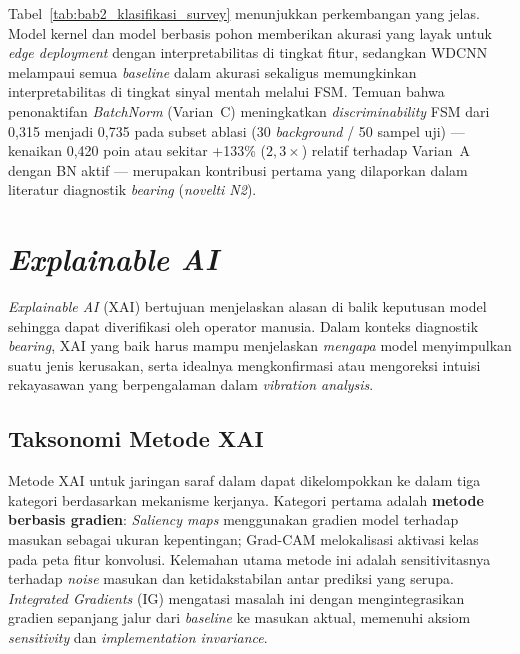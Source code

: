 Tabel~\ref{tab:bab2_klasifikasi_survey} menunjukkan perkembangan yang jelas.
Model kernel dan model berbasis pohon memberikan akurasi yang layak untuk \emph{edge
deployment} dengan interpretabilitas di tingkat fitur, sedangkan WDCNN
melampaui semua \emph{baseline} dalam akurasi sekaligus memungkinkan
interpretabilitas di tingkat sinyal mentah melalui FSM. Temuan bahwa
{\color{blue}penonaktifan \emph{BatchNorm} (Varian~C) meningkatkan
\emph{discriminability} FSM dari 0,315 menjadi 0,735 pada subset ablasi
(30 \emph{background} / 50 sampel uji) --- kenaikan 0,420 poin
atau sekitar +133\% ($2{,}3\times$) relatif terhadap Varian~A dengan BN aktif} --- merupakan
kontribusi pertama yang dilaporkan dalam literatur diagnostik \emph{bearing}
(\emph{novelti N2}).

\section{\emph{Explainable AI}}
\label{sec:bab2_xai}

\emph{Explainable AI} (XAI) bertujuan menjelaskan alasan di balik keputusan
model sehingga dapat diverifikasi oleh operator manusia. Dalam konteks diagnostik
\emph{bearing}, XAI yang baik harus mampu menjelaskan \emph{mengapa} model menyimpulkan
suatu jenis kerusakan, serta idealnya mengkonfirmasi atau mengoreksi intuisi
rekayasawan yang berpengalaman dalam \emph{vibration analysis}.

\subsection{Taksonomi Metode XAI}
\label{subsec:bab2_taksonomi_xai}

Metode XAI untuk jaringan saraf dalam dapat dikelompokkan ke dalam tiga kategori
berdasarkan mekanisme kerjanya. Kategori pertama adalah \textbf{metode berbasis
gradien}: \emph{Saliency maps}  menggunakan
gradien model terhadap masukan sebagai ukuran kepentingan; Grad-CAM
 melokalisasi aktivasi kelas pada peta fitur
konvolusi. Kelemahan utama metode ini adalah sensitivitasnya terhadap
\emph{noise} masukan dan ketidakstabilan antar prediksi yang serupa.
\emph{Integrated Gradients} (IG)  mengatasi
masalah ini dengan mengintegrasikan gradien sepanjang jalur dari \emph{baseline}
ke masukan aktual, memenuhi aksiom \emph{sensitivity} dan \emph{implementation
invariance}.

